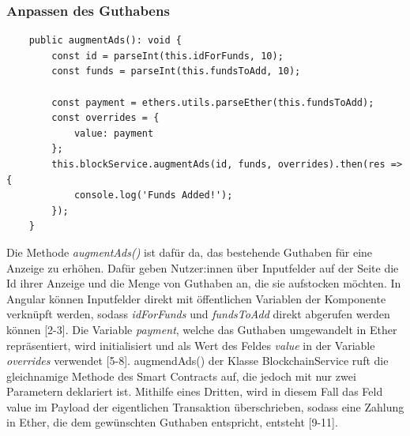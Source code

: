 \subsubsection{Anpassen des Guthabens}
\begin{lstlisting}
	public augmentAds(): void {
		const id = parseInt(this.idForFunds, 10);
		const funds = parseInt(this.fundsToAdd, 10);
		
		const payment = ethers.utils.parseEther(this.fundsToAdd);
		const overrides = {
			value: payment
		};
		this.blockService.augmentAds(id, funds, overrides).then(res => {
			console.log('Funds Added!');
		});
	}
\end{lstlisting}
Die Methode \emph{augmentAds()} ist dafür da, das bestehende Guthaben für eine Anzeige zu erhöhen. 
Dafür geben Nutzer:innen über Inputfelder auf der Seite die Id ihrer Anzeige und die Menge von Guthaben an, die sie aufstocken möchten. 
In Angular können Inputfelder direkt mit öffentlichen Variablen der Komponente verknüpft werden, sodass \emph{idForFunds} und \emph{fundsToAdd} direkt abgerufen werden können [2-3]. Die Variable \emph{payment}, welche das Guthaben umgewandelt in Ether repräsentiert, wird initialisiert und als Wert des Feldes \emph{value} in der Variable \emph{overrides} verwendet [5-8]. augmendAds() der Klasse BlockchainService ruft die gleichnamige Methode des Smart Contracts auf, die jedoch mit nur zwei Parametern deklariert ist. Mithilfe eines Dritten, wird in diesem Fall das Feld {value} im Payload der eigentlichen Transaktion überschrieben, sodass eine Zahlung in Ether, die dem gewünschten Guthaben entspricht, entsteht [9-11]. 
